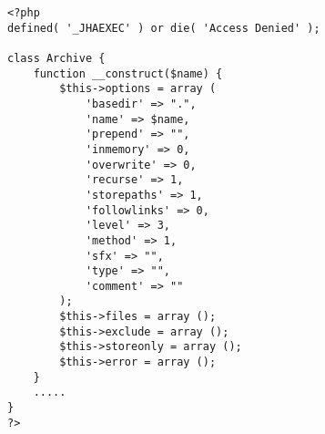 \begin{lstlisting}[label=compress_option,caption=Opciones para la configuraci\'on de los compresos.]
<?php
defined( '_JHAEXEC' ) or die( 'Access Denied' );

class Archive {
	function __construct($name) {
		$this->options = array (
			'basedir' => ".",
			'name' => $name,
			'prepend' => "",
			'inmemory' => 0,
			'overwrite' => 0,
			'recurse' => 1,
			'storepaths' => 1,
			'followlinks' => 0,
			'level' => 3,
			'method' => 1,
			'sfx' => "",
			'type' => "",
			'comment' => ""
		);
		$this->files = array ();
		$this->exclude = array ();
		$this->storeonly = array ();
		$this->error = array ();
	}
    .....
}
?>
\end{lstlisting}
